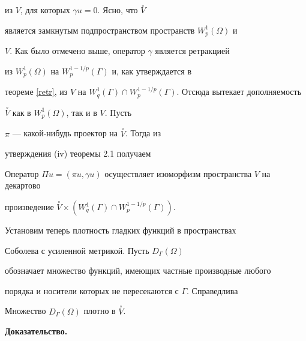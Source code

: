из $V$, для которых $\gamma u = 0$. Ясно, что $\overset{\circ}{V}$


является замкнутым подпространством пространств $W_p^1(\Omega)$ и


$V$. Как было отмечено выше, оператор $\gamma$ является ретракцией


из $W_p^1(\Omega)$ на $W_p^{1-1/p}(\Gamma)$ и, как утверждается в


теореме \ref{retr}, из $V$ на $W_q^1(\Gamma)\cap


W_p^{1-1/p}(\Gamma)$. Отсюда вытекает дополняемость


$\overset{\circ}{V}$ как в $W_p^1(\Omega)$, так и в $V$. Пусть


$\pi$ --- какой-нибудь проектор на $\overset{\circ}{V}$. Тогда из


утверждения (iv) теоремы 2.1 \cite{Timer} получаем





\begin{cornonum}


Оператор $ \Pi u = (\pi u, \gamma


u)$ осуществляет изоморфизм пространства $V$ на декартово


произведение $\overset{\circ}{V}{} \times (W_q^1(\Gamma)\cap


W_p^{1-1/p}(\Gamma))$. 


\end{cornonum}








Установим теперь плотность гладких функций в пространствах


Соболева с усиленной метрикой. Пусть $D_{\Gamma}(\Omega)$


обозначает множество функций, имеющих частные производные любого


порядка и носители которых не пересекаются с $\Gamma$. Справедлива





\begin{thms} \label{C0densV0}


Множество $D_{\Gamma}(\Omega)$ плотно в $\overset{\circ}{V}$.


\end{thms}





{\bf Доказательство.}


